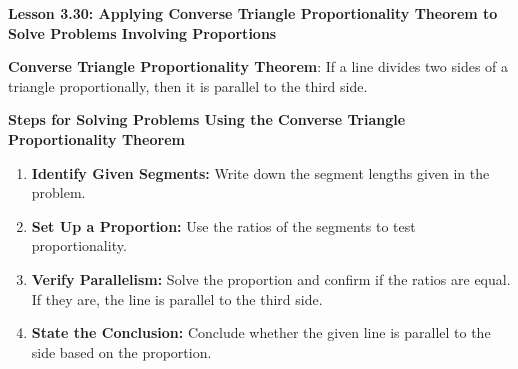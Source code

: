 \begin{center}
\textbf{Lesson 3.30: Applying Converse Triangle Proportionality Theorem to Solve Problems Involving Proportions}
\end{center}

\vspace*{-1.5ex}

\noindent\textbf{Converse Triangle Proportionality Theorem}: If a line divides two sides of a triangle proportionally, then it is parallel to the third side.

\noindent\textbf{Steps for Solving Problems Using the Converse Triangle Proportionality Theorem}
\begin{enumerate}
    \item \textbf{Identify Given Segments:} Write down the segment lengths given in the problem.
    \item \textbf{Set Up a Proportion:} Use the ratios of the segments to test proportionality.
    \item \textbf{Verify Parallelism:} Solve the proportion and confirm if the ratios are equal. If they are, the line is parallel to the third side.
    \item \textbf{State the Conclusion:} Conclude whether the given line is parallel to the side based on the proportion.
\end{enumerate}
